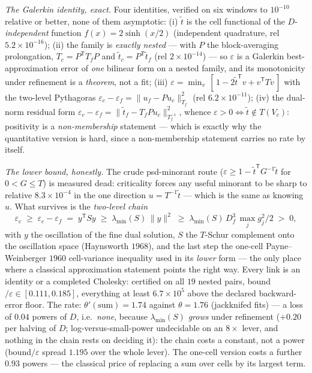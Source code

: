 \documentclass[11pt,a4paper]{article}
\begin{document}
\emph{The Galerkin identity, exact.} Four identities, verified on six windows to $10^{-10}$
relative or better, none of them asymptotic: (i) $\tilde t$ is the cell functional of the
$D$-\emph{independent} function $f(x)=2\sinh(x/2)$ (independent quadrature, rel
$5.2\times10^{-16}$); (ii) the family is \emph{exactly nested} --- with $P$ the block-averaging
prolongation, $T_c=P^{\mathsf T}T_fP$ and $\tilde t_c=P^{\mathsf T}\tilde t_f$ (rel
$2\times10^{-14}$) --- so $\varepsilon$ is a Galerkin best-approximation error of \emph{one}
bilinear form on a nested family, and its monotonicity under refinement is a \emph{theorem}, not
a fit; (iii) $\varepsilon=\min_v\,[\,1-2\tilde t^{\mathsf T}v+v^{\mathsf T}Tv\,]$ with the
two-level Pythagoras $\varepsilon_c-\varepsilon_f=\|u_f-Pu_c\|^2_{T_f}$ (rel
$6.2\times10^{-11}$); (iv) the dual-norm residual form
$\varepsilon_c-\varepsilon_f=\|\tilde t_f-T_fPu_c\|^2_{T_f^{-1}}$, whence
$\varepsilon>0\iff\tilde t\notin T(V_c)$: positivity is a \emph{non-membership} statement ---
which is exactly why the quantitative version is hard, since a non-membership statement carries
no rate by itself.

\emph{The lower bound, honestly.} The crude psd-minorant route
($\varepsilon\ge1-\tilde t^{\mathsf T}G^{-1}\tilde t$ for $0<G\le T$) is measured dead:
criticality forces any useful minorant to be sharp to relative $8.3\times10^{-4}$ in the one
direction $u=T^{-1}\tilde t$ --- which is the same as knowing $u$. What survives is the
\emph{two-level chain}
\[
\varepsilon_c\;\ge\;\varepsilon_c-\varepsilon_f\;=\;y^{\mathsf T}Sy\;\ge\;
\lambda_{\min}(S)\,\|y\|^2\;\ge\;\lambda_{\min}(S)\,D_f^3\,\max_j g_j^2/2\;>\;0,
\]
with $y$ the oscillation of the fine dual solution, $S$ the $T$-Schur complement onto the
oscillation space (Haynsworth $1968$), and the last step the one-cell Payne--Weinberger $1960$
cell-variance inequality used in its \emph{lower} form --- the only place where a classical
approximation statement points the right way. Every link is an identity or a completed Cholesky:
certified on all $19$ nested pairs, bound$/\varepsilon\in[0.111,0.185]$, everything at least
$6.7\times10^{5}$ above the declared backward-error floor. The rate:
$\theta'(\mathrm{sum})=1.74$ against $\theta=1.76$ (jackknifed fits) --- a loss of $0.04$ powers
of $D$, i.e.\ \emph{none}, because $\lambda_{\min}(S)$ \emph{grows} under refinement ($+0.20$ per
halving of $D$; log-versus-small-power undecidable on an $8\times$ lever, and nothing in the
chain rests on deciding it): the chain costs a constant, not a power (bound$/\varepsilon$ spread
$1.195$ over the whole lever). The one-cell version costs a further $0.93$ powers --- the
classical price of replacing a sum over cells by its largest term.
\end{document}
